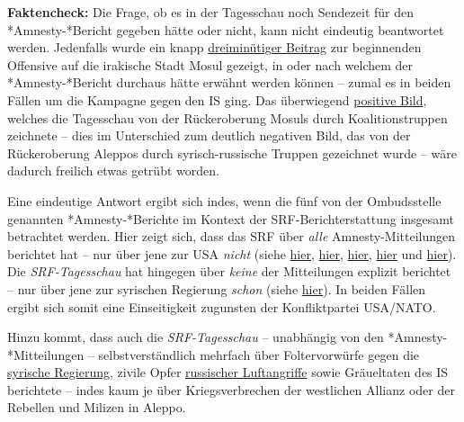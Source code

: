 \textbf{Faktencheck:} Die Frage, ob es in der Tagesschau noch Sendezeit
für den *Amnesty-*Bericht gegeben hätte oder nicht, kann nicht eindeutig
beantwortet werden. Jedenfalls wurde ein knapp
\href{http://www.srf.ch/play/tv/tagesschau/video/tagesschau-vom-26-10-2016-1930?id=73af5ad6-ee40-4182-ab1a-b73af5ae3134}{dreiminütiger
Beitrag} zur beginnenden Offensive auf die irakische Stadt Mosul
gezeigt, in oder nach welchem der *Amnesty-*Bericht durchaus hätte
erwähnt werden können -- zumal es in beiden Fällen um die Kampagne gegen
den IS ging. Das überwiegend
\href{http://www.srf.ch/news/international/wirkliche-befreiung-von-mossul-hat-begonnen}{positive
Bild}, welches die Tagesschau von der Rückeroberung Mosuls durch
Koalitionstruppen zeichnete -- dies im Unterschied zum deutlich
negativen Bild, das von der Rückeroberung Aleppos durch
syrisch-russische Truppen gezeichnet wurde -- wäre dadurch freilich
etwas getrübt worden.

Eine eindeutige Antwort ergibt sich indes, wenn die fünf von der
Ombudsstelle genannten *Amnesty-*Berichte im Kontext der
SRF-Berichterstattung insgesamt betrachtet werden. Hier zeigt sich, dass
das SRF über \emph{alle} Amnesty-Mitteilungen berichtet hat -- nur über
jene zur USA \emph{nicht} (siehe
\href{http://www.srf.ch/news/international/bericht-russische-bomben-treffen-wohngebiete-in-syrien}{hier},
\href{http://www.srf.ch/sendungen/info-3/amnesty-international-macht-syrischen-kurden-schwere-vorwuerfe}{hier},
\href{http://www.srf.ch/news/international/amnesty-bericht-kurden-vertreiben-irakische-araber}{hier},
\href{http://www.srf.ch/news/international/amnesty-wirft-syrischen-rebellen-menschenrechtsverletzungen-vor}{hier}
und
\href{http://www.srf.ch/news/international/amnesty-grauenhafte-beweise-fuer-is-massaker}{hier}).
Die \emph{SRF-Tagesschau} hat hingegen über \emph{keine} der
Mitteilungen explizit berichtet -- nur über jene zur syrischen Regierung
\emph{schon} (siehe
\href{http://www.srf.ch/play/tv/tagesschau/video/18000-starben-in-syrischen-gefaengnissen?id=7302a9f0-3d4b-43fe-a61f-5f77636cbdc6}{hier}).
In beiden Fällen ergibt sich somit eine Einseitigkeit zugunsten der
Konfliktpartei USA/NATO.

Hinzu kommt, dass auch die \emph{SRF-Tagesschau} -- unabhängig von den
*Amnesty-*Mitteilungen -- selbstverständlich mehrfach über
Foltervorwürfe gegen die
\href{http://www.srf.ch/news/international/uno-in-syrien-werden-systematisch-haeftlinge-getoetet}{syrische
Regierung}, zivile Opfer
\href{http://www.srf.ch/news/international/russische-luftangriffe-verschaerfen-das-leid-in-syrien}{russischer
Luftangriffe} sowie Gräueltaten des IS berichtete -- indes kaum je über
Kriegsverbrechen der westlichen Allianz oder der Rebellen und Milizen in
Aleppo.

